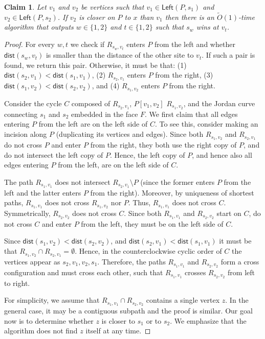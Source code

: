 \documentclass{article}
\newcommand{\Left}{\mathsf{Left}}
\newcommand{\dist}{\mathsf{dist}}
\newtheorem{claim}{Claim}
\newcommand{\Otild}{\tilde{O}}
\begin{document}
\begin{claim}\label{clm:criss-cross}
    Let $v_1$ and $v_2$ be  vertices such that $v_1\in\Left(P,s_1)$ and $v_2\in\Left(P,s_2)$.
    If $v_2$ is closer on $P$ to $x$ than $v_1$ then there is an $\Otild(1)$-time algorithm that outputs $w\in\{1,2\}$ and $t\in\{1,2\}$ such that $s_w$ wins at $v_t$.
\end{claim}
\begin{proof}
For every $w,t$ we check if $R_{s_w,v_t}$ enters $P$ from the left and whether $\dist(s_w,v_t)$ is smaller than the distance of the other site to $v_t$.
If such a pair is found, we return  this pair.
Otherwise, it must be that: (1) $\dist(s_2,v_1)<\dist(s_1,v_1)$, (2) $R_{s_2,v_1}$ enters $P$ from the right, (3) $\dist(s_1,v_2)<\dist(s_2,v_2)$, and (4) $R_{s_1,v_2}$ enters $P$ from the right.

Consider the cycle $C$ composed of $R_{s_2,v_1}$, $P[v_1,v_2]$  $R_{s_1,v_2}$, and the Jordan curve connecting $s_1$ and $s_2$ embedded in the face $F$.
We first claim that all edges entering $P$ from the left are on the left side of $C$.
To see this, consider making an incision along $P$ (duplicating its vertices and edges).
Since both $R_{s_1,v_2}$ and $R_{s_2,v_1}$ do not cross $P$ and enter $P$ from the right, they both use the right copy of $P$, and do not intersect the left copy of $P$. Hence, the left copy of $P$, and hence also all edges entering $P$ from the left, are on the left side of $C$.

The path $R_{s_1,v_1}$  does not intersect $R_{s_2,v_1}\setminus P$ (since the former enters $P$ from the left and the latter enters $P$ from the right).
Moreover, by uniqueness of shortest paths, $R_{s_1,v_1}$  does not cross $R_{s_1,v_2}$ nor $P$.
Thus, $R_{s_1,v_1}$ does not cross $C$.
Symmetrically, $R_{s_2,v_2}$ does not cross $C$.
Since both $R_{s_1,v_1}$  and  $R_{s_2,v_2}$ start on $C$, do not cross $C$ and enter $P$ from the left, they must be on the left side of $C$.

Since $\dist(s_1,v_2)<\dist(s_2,v_2)$, and $\dist(s_2,v_1)<\dist(s_1,v_1)$ it must be  that $R_{s_1,v_2}\cap R_{s_2,v_1}=\emptyset$.
Hence, in the counterclockwise cyclic order of $C$ the vertices appear as $s_2,v_1,v_2,s_1$.
Therefore, the paths $R_{s_1,v_1}$  and  $R_{s_2,v_2}$  form a cross configuration and must cross each other, such that $R_{s_1,v_1}$ crosses $R_{s_2,v_2}$ from left to right.

For simplicity, we assume that $R_{s_1,v_1}\cap R_{s_2,v_2}$ contains a single vertex $z$.
In the general case, it may be a contiguous subpath and the proof is similar.
Our goal now is to determine whether $z$ is closer to $s_1$ or to $s_2$.
We emphasize that the algorithm does not find $z$ itself at any time.


\end{proof}
\end{document}
